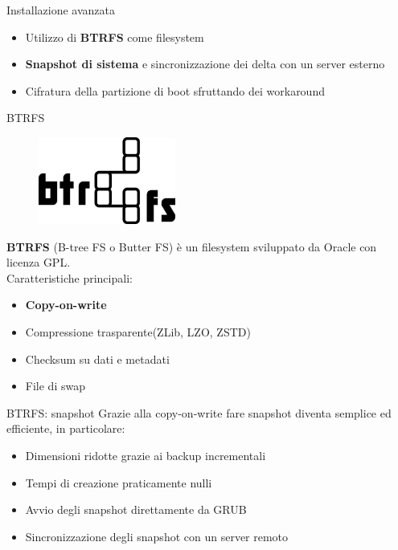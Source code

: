 \begin{frame}{Installazione avanzata}
    \begin{itemize}
        \item Utilizzo di \textbf{BTRFS} come filesystem
        \item \textbf{Snapshot di sistema} e sincronizzazione dei delta con un server esterno
        \item Cifratura della partizione di boot sfruttando dei workaround
    \end{itemize}
\end{frame}
\begin{frame}{BTRFS}
    \begin{figure}[h]
        \includegraphics[width=0.4\textwidth]{images/btrfs.png}
    \end{figure}
    \textbf{BTRFS} (B-tree FS o Butter FS) è un filesystem sviluppato da Oracle con licenza GPL.\\
    \vspace{10pt}
    Caratteristiche principali:
    \begin{itemize}
        \item \textbf{Copy-on-write}
        \item Compressione trasparente(ZLib, LZO, ZSTD)
        \item Checksum su dati e metadati
        \item File di swap
    \end{itemize}
\end{frame}
\begin{frame}{BTRFS: snapshot}
    Grazie alla copy-on-write fare snapshot diventa semplice ed efficiente, in particolare:
    \begin{itemize}
        \item Dimensioni ridotte grazie ai backup incrementali
        \item Tempi di creazione praticamente nulli
        \item Avvio degli snapshot direttamente da GRUB
        \item Sincronizzazione degli snapshot con un server remoto
    \end{itemize}
\end{frame}

